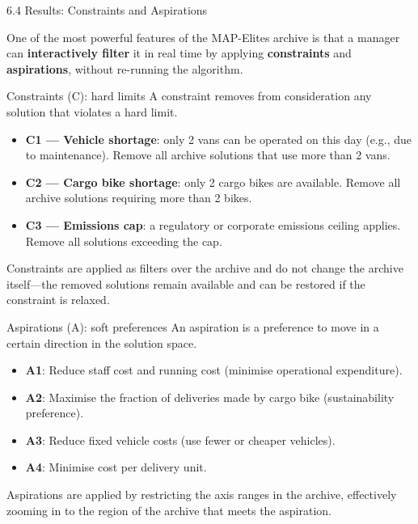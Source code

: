 \documentclass[aspectratio=169,10pt]{beamer}
\begin{document}
\begin{frame}[allowframebreaks]{6.4 Results: Constraints and Aspirations}

One of the most powerful features of the MAP-Elites archive is that
a manager can \textbf{interactively filter} it in real time by applying
\textbf{constraints} and \textbf{aspirations}, without re-running
the algorithm.

\medskip
\begin{block}{Constraints (C): hard limits}
A constraint removes from consideration any solution that violates a
hard limit.
\begin{itemize}
  \item \textbf{C1 --- Vehicle shortage}: only 2 vans can be operated
        on this day (e.g., due to maintenance).
        Remove all archive solutions that use more than 2 vans.
  \item \textbf{C2 --- Cargo bike shortage}: only 2 cargo bikes are
        available.
        Remove all archive solutions requiring more than 2 bikes.
  \item \textbf{C3 --- Emissions cap}: a regulatory or corporate
        emissions ceiling applies.
        Remove all solutions exceeding the cap.
\end{itemize}
Constraints are applied as filters over the archive and do not change
the archive itself---the removed solutions remain available and can be
restored if the constraint is relaxed.
\end{block}

\medskip
\begin{block}{Aspirations (A): soft preferences}
An aspiration is a preference to move in a certain direction in the
solution space.
\begin{itemize}
  \item \textbf{A1}: Reduce staff cost and running cost
        (minimise operational expenditure).
  \item \textbf{A2}: Maximise the fraction of deliveries made by cargo
        bike (sustainability preference).
  \item \textbf{A3}: Reduce fixed vehicle costs (use fewer or cheaper
        vehicles).
  \item \textbf{A4}: Minimise cost per delivery unit.
\end{itemize}
Aspirations are applied by restricting the axis ranges in the archive,
effectively zooming in to the region of the archive that meets the
aspiration.
\end{block}


\end{frame}
\end{document}
